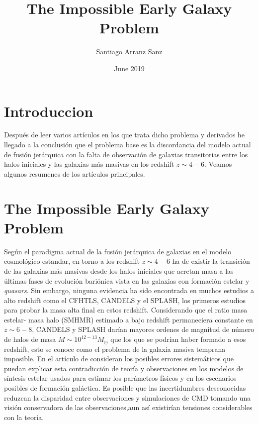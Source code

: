 \documentclass{article}
\title{The Impossible  Early Galaxy Problem}
\author{Santiago Arranz Sanz }
\date{June 2019}
\begin{document}
\maketitle

\section*{Introduccion}

Después de leer varios artículos en los que trata dicho problema y derivados he llegado a la conclusión que el problema base es la discordancia del modelo actual de fusión jerárquica con la falta de observación de galaxias transitorias entre los halos iniciales y las galaxias más masivas en los redshift $z\sim 4-6$. Veamos algunos resumenes de los artículos principales.

\section{The Impossible Early Galaxy Problem}
\citep{steinhardt2016impossibly} Según el paradigma actual de la fusión jerárquica de galaxias en el modelo cosmológico estandar, en torno a los redshift $z\sim 4-6$ ha de existir la transición de las galaxias más masivas desde los halos iniciales que acretan masa a las últimas fases de evolución bariónica vista en las galaxias con formación estelar y \textit{quasars}. Sin embargo, ninguna evidencia ha sido encontrada en muchos estudios a alto redshift como el CFHTLS, CANDELS y el SPLASH, los primeros estudios para probar la masa alta final en estos redshift. Considerando que el ratio masa estelar- masa halo (SMHMR) estimado a bajo redshift permaneciera constante en $z\sim 6-8$, CANDELS y SPLASH darían mayores ordenes de magnitud de número de halos de masa $M\sim 10^{12-13}M_\odot$ que los que se podrían haber formado a esos redshift, esto se conoce como el problema de la galaxia masiva temprana imposible. En el artículo de \cite{steinhardt2016impossibly} consideran los posibles errores sistemáticos que puedan explicar esta contradicción de teoría y observaciones en los modelos de síntesis estelar usados para estimar los parámetros físicos  y en los escenarios posibles de formación galáctica. Es posible que las incertidumbres desconocidas reduzcan la disparidad entre observaciones y simulaciones de CMD tomando una visión conservadora de las observaciones,aun así existirían tensiones considerables con la teoría.\\
\end{document}
